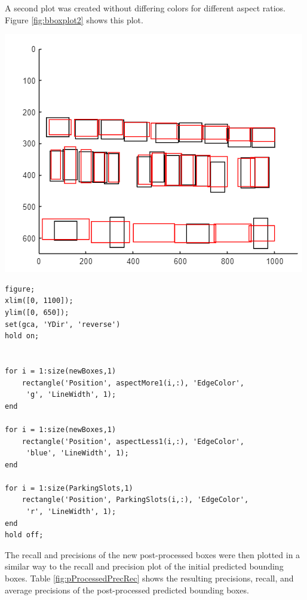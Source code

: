 \documentclass[man]{apa7}
\begin{document}
A second plot was created without differing colors for different aspect ratios. Figure \ref{fig:bboxplot2} shows this plot.

\begin{minipage}{\linewidth}
  \includegraphics[height=\textheight/4,width=\textwidth/2]{figures/bboxplot2.png}
  \label{fig:bboxplot2}
\end{minipage}

\begin{lstlisting}
figure;
xlim([0, 1100]);
ylim([0, 650]);
set(gca, 'YDir', 'reverse')
hold on;


for i = 1:size(newBoxes,1)
    rectangle('Position', aspectMore1(i,:), 'EdgeColor',
     'g', 'LineWidth', 1);
end

for i = 1:size(newBoxes,1)
    rectangle('Position', aspectLess1(i,:), 'EdgeColor',
     'blue', 'LineWidth', 1);
end

for i = 1:size(ParkingSlots,1)
    rectangle('Position', ParkingSlots(i,:), 'EdgeColor',
     'r', 'LineWidth', 1);
end
hold off;
\end{lstlisting}

The recall and precisions of the new post-processed boxes were then plotted in a similar way to the recall and precision plot of the initial predicted bounding boxes. Table \ref{fig:pProcessedPrecRec} shows the resulting precisions, recall, and average precisions of the post-processed predicted bounding boxes.
\end{document}
